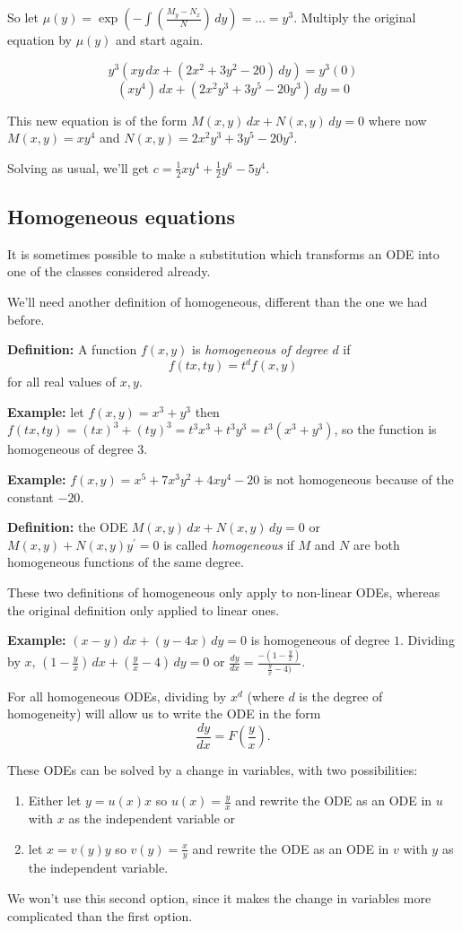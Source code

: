 \documentclass[11pt]{article}
\newcommand{\example}{\textbf{Example: }}
\newcommand{\definition}{\textbf{Definition: }}
\newcommand{\fdx}{\frac{dy}{dx}} %
\newcommand{\yp}{y^{\prime}}
\newcommand{\dx}{\,dx} %
\newcommand{\dy}{\,dy} %
\begin{document}
	So let $\mu(y) = \exp(- \int \left(\frac{M_y - N_x}{N}\right)\dy ) = \ldots = y^3$. Multiply the original equation by $\mu(y)$ and start again.

	$$ y^3 (xy \dx + (2x^2 + 3y^2 - 20)\dy) = y^3 (0) $$
	$$ (x y^4)\dx + (2x^2y^3 + 3y^5 - 20 y^3)\dy = 0 $$

	This new equation is of the form $M(x,y)\dx + N(x,y)\dy = 0$ where now $M(x,y) = xy^4$ and $N(x,y) = 2x^2y^3 + 3y^5 - 20y^3$.

	Solving as usual, we'll get $c = \frac{1}{2}xy^4 + \frac{1}{2}y^6 - 5y^4$.

\subsection{Homogeneous equations}
	It is sometimes possible to make a substitution which transforms an ODE into one of the classes considered already.

	We'll need another definition of homogeneous, different than the one we had before.

	\definition A function $f(x,y)$ is \emph{homogeneous of degree $d$} if
		$$ f(tx, ty) = t^d f(x,y) $$
	for all real values of $x,y$.

	\example let $f(x,y) = x^3 + y^3$ then $f(tx,ty) = (tx)^3 + (ty)^3 = t^3x^3 + t^3y^3 = t^3(x^3 + y^3)$, so the function is homogeneous of degree $3$.

	\example $f(x,y) = x^5 + 7x^3y^2 + 4xy^4 - 20$ is not homogeneous because of the constant $-20$.

	\definition the ODE $M(x,y)\dx + N(x,y)\dy = 0$ or $M(x,y) + N(x,y)\yp = 0$ is called \emph{homogeneous} if $M$ and $N$ are both homogeneous functions of the same degree.

	These two definitions of homogeneous only apply to non-linear ODEs, whereas the original definition only applied to linear ones.

	\example $(x-y)\dx + (y-4x)\dy = 0$ is homogeneous of degree $1$. Dividing by $x$, $(1-\frac{y}{x})\dx + (\frac{y}{x} - 4)\dy = 0$ or $\fdx = \frac{-(1 - \frac{y}{x})}{\frac{y}{x} - 4)}$.

	For all homogeneous ODEs, dividing by $x^d$ (where $d$ is the degree of homogeneity) will allow us to write the ODE in the form
		$$ \fdx = F(\frac{y}{x}). $$

	These ODEs can be solved by a change in variables, with two possibilities:
		\begin{enumerate}
			\item Either let $y = u(x) x$ so $u(x) = \frac{y}{x}$ and rewrite the ODE as an ODE in $u$ with $x$ as the independent variable or
			\item let $x = v(y) y$ so $v(y) = \frac{x}{y}$ and rewrite the ODE as an ODE in $v$ with $y$ as the independent variable.
		\end{enumerate}
	We won't use this second option, since it makes the change in variables more complicated than the first option.
\end{document}

